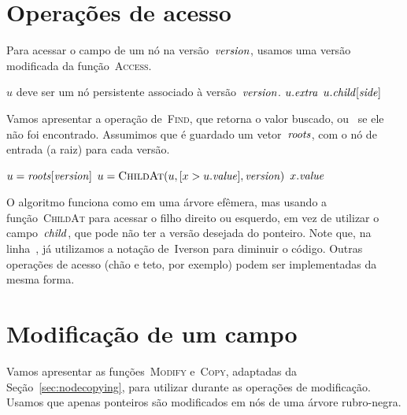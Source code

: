\documentclass[../../main.tex]{subfiles}
\begin{document}
\section{Operações de acesso}

Para acessar o campo de um nó na versão~$\mathit{version}$, usamos uma versão modificada da função~\textsc{Access}.

\begin{algorithm}
\begin{algorithmic}[1]

\Require $u$ deve ser um nó persistente associado à versão~$\mathit{version}$.
		\State \Return $u.\mathit{extra}$
	\EndIf
	\State \Return $u.\mathit{child}[\mathit{side}]$
\EndFunction

\end{algorithmic}
\end{algorithm}

Vamos apresentar a operação de~\textsc{Find}, que retorna o valor buscado, ou~ se ele não foi encontrado. Assumimos que é guardado um vetor~$\mathit{roots}$, com o nó de entrada (a raiz) para cada versão.

\begin{algorithm}
\begin{algorithmic}[1]

	\State $u = \mathit{roots}[\mathit{version}]$
	\State $u = \Call{ChildAt}{u, [x > u.\val], \version}$ \label{line:findrb:iver}
	\EndWhile
		\State \Return \Null
	\Else
		\State \Return $x.\mathit{value}$
	\EndIf
\EndFunction

\end{algorithmic}
\end{algorithm}

O algoritmo funciona como em uma árvore efêmera, mas usando a função~\textsc{ChildAt} para acessar o filho direito ou esquerdo, em vez de utilizar o campo~$\mathit{child}$, que pode não ter a versão desejada do ponteiro. Note que, na linha~, já utilizamos a notação de~Iverson para diminuir o código. Outras operações de acesso (chão e teto, por exemplo) podem ser implementadas da mesma forma.

\section{Modificação de um campo}

Vamos apresentar as funções~\textsc{Modify} e~\textsc{Copy}, adaptadas da Seção~\ref{sec:nodecopying}, para utilizar durante as operações de modificação. Usamos que apenas ponteiros são modificados em nós de uma árvore rubro-negra.
\end{document}
